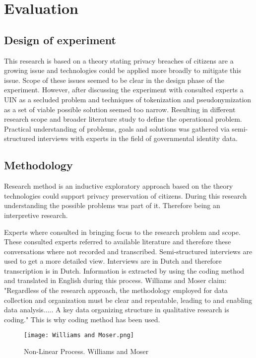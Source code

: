 \chapter{Evaluation}\label{s:evaluation}

\section{Design of experiment}
This research is based on a theory stating privacy breaches of citizens are a growing issue and technologies could be applied more broadly to mitigate this issue. Scope of these issues seemed to be clear in the design phase of the experiment. However, after discussing the experiment with consulted experts a UIN as a secluded problem and techniques of tokenization and pseudonymization as a set of viable possible solution seemed too narrow. Resulting in different research scope and broader literature study to define the operational problem. Practical understanding of problems, goals and solutions was gathered via semi-structured interviews with experts in the field of governmental identity data.

\section{Methodology}
Research method is an inductive exploratory approach based on the theory technologies could support privacy preservation of citizens. During this research understanding the possible problems was part of it. Therefore being an interpretive research.

Experts where consulted in bringing focus to the research problem and scope. These consulted experts referred to available literature and therefore these conversations where not recorded and transcribed. Semi-structured interviews are used to get a more detailed view. Interviews are in Dutch and therefore transcription is in Dutch. Information is extracted by using the coding method and translated in English during this process. Williams and Moser \cite{Williams2019TheAO} claim: "Regardless of the research approach, the methodology employed for data collection and
organization must be clear and repeatable, leading to and enabling data analysis..... A key data organizing structure in qualitative research is coding." This is why coding method has been used. 

    \begin{figure}
        \graphicspath{ {./images/} }
        \centering
        \texttt{[image: Williams and Moser.png]}\\
        \caption{Non-Linear Process. Williams and Moser \cite{Williams2019TheAO}}
        \label{fig:WM2019}
    \end{figure}

